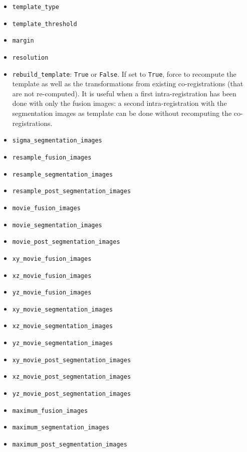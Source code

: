 \begin{itemize}
\item \texttt{template\_type}
\item \texttt{template\_threshold}
\item \texttt{margin}
\item \texttt{resolution}
\item \texttt{rebuild\_template}:
  \texttt{True} or \texttt{False}.
  If set to \texttt{True}, force to recompute the template as well as the
  transformations from existing co-registrations (that are not
  re-computed). It is useful when a first intra-registration has been
  done with only the fusion images: a second intra-registration with
  the segmentation images as template can be done without recomputing 
  the co-registrations.
\item \texttt{sigma\_segmentation\_images}
\item \texttt{resample\_fusion\_images}
\item \texttt{resample\_segmentation\_images}
\item \texttt{resample\_post\_segmentation\_images}
\item \texttt{movie\_fusion\_images}
\item \texttt{movie\_segmentation\_images}
\item \texttt{movie\_post\_segmentation\_images}
\item \texttt{xy\_movie\_fusion\_images}
\item \texttt{xz\_movie\_fusion\_images}
\item \texttt{yz\_movie\_fusion\_images}
\item \texttt{xy\_movie\_segmentation\_images}
\item \texttt{xz\_movie\_segmentation\_images}
\item \texttt{yz\_movie\_segmentation\_images}
\item \texttt{xy\_movie\_post\_segmentation\_images}
\item \texttt{xz\_movie\_post\_segmentation\_images}
\item \texttt{yz\_movie\_post\_segmentation\_images}
\item \texttt{maximum\_fusion\_images}
\item \texttt{maximum\_segmentation\_images}
\item \texttt{maximum\_post\_segmentation\_images}
\end{itemize}










